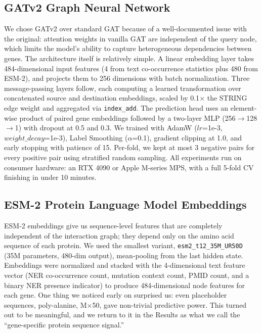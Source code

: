 \documentclass[12pt,a4paper]{article}
\begin{document}
\subsection{GATv2 Graph Neural Network}

We chose GATv2 \cite{brody2022} over standard GAT because of a well-documented issue with the original: attention weights in vanilla GAT are independent of the query node, which limits the model's ability to capture heterogeneous dependencies between genes. The architecture itself is relatively simple. A linear embedding layer takes 484-dimensional input features (4 from text co-occurrence statistics plus 480 from ESM-2), and projects them to 256 dimensions with batch normalization. Three message-passing layers follow, each computing a learned transformation over concatenated source and destination embeddings, scaled by 0.1$\times$ the STRING edge weight and aggregated via \texttt{index\_add}. The prediction head uses an element-wise product of paired gene embeddings followed by a two-layer MLP (256$\rightarrow$128$\rightarrow$1) with dropout at 0.5 and 0.3. We trained with AdamW ($lr$=1e-3, $weight\_decay$=1e-3), Label Smoothing ($\alpha$=0.1), gradient clipping at 1.0, and early stopping with patience of 15. Per-fold, we kept at most 3 negative pairs for every positive pair using stratified random sampling. All experiments run on consumer hardware: an RTX 4090 or Apple M-series MPS, with a full 5-fold CV finishing in under 10 minutes.

\subsection{ESM-2 Protein Language Model Embeddings}

ESM-2 embeddings \cite{lin2023} give us sequence-level features that are completely independent of the interaction graph; they depend only on the amino acid sequence of each protein. We used the smallest variant, \texttt{esm2\_t12\_35M\_UR50D} (35M parameters, 480-dim output), mean-pooling from the last hidden state. Embeddings were normalized and stacked with the 4-dimensional text feature vector (NER co-occurrence count, mutation context count, PMID count, and a binary NER presence indicator) to produce 484-dimensional node features for each gene. One thing we noticed early on surprised us: even placeholder sequences, poly-alanine, M$\times$50, gave non-trivial predictive power. This turned out to be meaningful, and we return to it in the Results as what we call the ``gene-specific protein sequence signal.''
\end{document}
